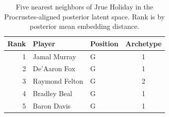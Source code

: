 \begin{table}[htbp]
  \centering\small
  \begin{tabular}{rllc}
    \toprule
    Rank & Player & Position & Archetype \\
    \midrule
    1 & Jamal Murray & G & 1 \\
    2 & De'Aaron Fox & G & 1 \\
    3 & Raymond Felton & G & 2 \\
    4 & Bradley Beal & G & 1 \\
    5 & Baron Davis & G & 1 \\
    \bottomrule
  \end{tabular}
  \caption{Five nearest neighbors of Jrue Holiday in the Procrustes-aligned posterior latent space. Rank is by posterior mean embedding distance.}
  \label{tab:Jrue_Holiday_neighbors}
\end{table}

